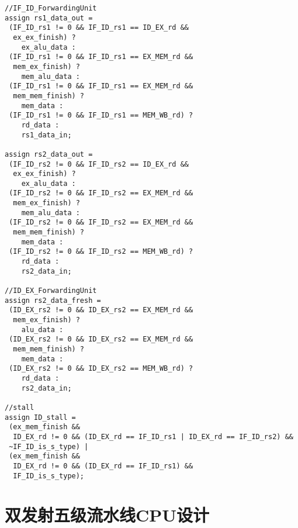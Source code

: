 \documentclass{article}
\begin{document}
        \begin{verbatim}
//IF_ID_ForwardingUnit
assign rs1_data_out = 
 (IF_ID_rs1 != 0 && IF_ID_rs1 == ID_EX_rd && 
  ex_ex_finish) ? 
    ex_alu_data :
 (IF_ID_rs1 != 0 && IF_ID_rs1 == EX_MEM_rd && 
  mem_ex_finish) ? 
    mem_alu_data :
 (IF_ID_rs1 != 0 && IF_ID_rs1 == EX_MEM_rd && 
  mem_mem_finish) ? 
    mem_data :
 (IF_ID_rs1 != 0 && IF_ID_rs1 == MEM_WB_rd) ? 
    rd_data :
    rs1_data_in;

assign rs2_data_out = 
 (IF_ID_rs2 != 0 && IF_ID_rs2 == ID_EX_rd && 
  ex_ex_finish) ? 
    ex_alu_data :
 (IF_ID_rs2 != 0 && IF_ID_rs2 == EX_MEM_rd && 
  mem_ex_finish) ? 
    mem_alu_data :
 (IF_ID_rs2 != 0 && IF_ID_rs2 == EX_MEM_rd && 
  mem_mem_finish) ? 
    mem_data :
 (IF_ID_rs2 != 0 && IF_ID_rs2 == MEM_WB_rd) ? 
    rd_data :
    rs2_data_in;

//ID_EX_ForwardingUnit
assign rs2_data_fresh =
 (ID_EX_rs2 != 0 && ID_EX_rs2 == EX_MEM_rd && 
  mem_ex_finish) ? 
    alu_data :
 (ID_EX_rs2 != 0 && ID_EX_rs2 == EX_MEM_rd && 
  mem_mem_finish) ? 
    mem_data :
 (ID_EX_rs2 != 0 && ID_EX_rs2 == MEM_WB_rd) ? 
    rd_data :
    rs2_data_in;

//stall    
assign ID_stall = 
 (ex_mem_finish && 
  ID_EX_rd != 0 && (ID_EX_rd == IF_ID_rs1 | ID_EX_rd == IF_ID_rs2) && 
 ~IF_ID_is_s_type) | 
 (ex_mem_finish && 
  ID_EX_rd != 0 && (ID_EX_rd == IF_ID_rs1) && 
  IF_ID_is_s_type);
        \end{verbatim}

    \newpage{}
    \section{双发射五级流水线CPU设计}
\end{document}
